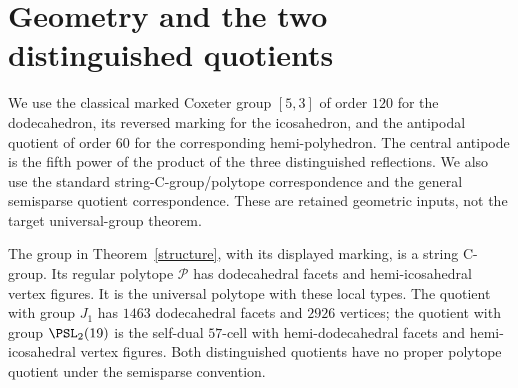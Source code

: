 \section{Geometry and the two distinguished quotients}
We use the classical marked Coxeter group $[5,3]$ of order $120$ for the dodecahedron, its reversed marking for the icosahedron, and the antipodal quotient of order $60$ for the corresponding hemi-polyhedron. The central antipode is the fifth power of the product of the three distinguished reflections. We also use the standard string-C-group/polytope correspondence and the general semisparse quotient correspondence. These are retained geometric inputs, not the target universal-group theorem.

\begin{theorem}\label{geometry}
The group in Theorem~\ref{structure}, with its displayed marking, is a string C-group. Its regular polytope $\mathcal P$ has dodecahedral facets and hemi-icosahedral vertex figures. It is the universal polytope with these local types. The quotient with group $J_1$ has $1463$ dodecahedral facets and $2926$ vertices; the quotient with group $\PSL_2(19)$ is the self-dual $57$-cell with hemi-dodecahedral facets and hemi-icosahedral vertex figures. Both distinguished quotients have no proper polytope quotient under the semisparse convention.
\end{theorem}
